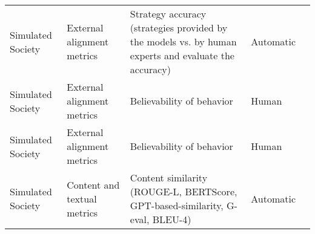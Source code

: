 \begin{small}
\begin{center}
\begin{longtable}{@{}p{}p{}p{}p{}p{}@{}}
Simulated Society        & External alignment metrics          & Strategy accuracy (strategies provided by the models vs. by human experts and evaluate the accuracy)                                                                                                        & Automatic & \cite{zhang2024selfemotionblendeddialoguegeneration}                                                                                                                                                                                                                                                                                                                                                                                       \\
Simulated Society        & External alignment metrics          & Believability of behavior                                                                                                                                                                                   & Human     & \cite{zhou2024sotopiainteractiveevaluationsocial}                                                                                                                                                                                                                                                                                                                                                                                              \\
Simulated Society        & External alignment metrics          & Believability of behavior                                                                                                                                                                                   & Human     & \cite{park2023generative}                                                                                                                                                                                                                                                                                                                                                                                \\
Simulated Society        & Content and textual metrics         & Content similarity (ROUGE-L, BERTScore, GPT-based-similarity, G-eval, BLEU-4)                                                                                                                               & Automatic & \cite{li2024hello}                                                                                                                                                                                                                                                                                                                                                                                                        \\

\end{longtable}
\end{center}
\end{small}
